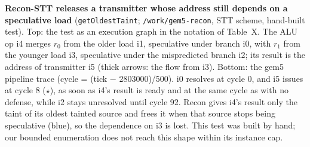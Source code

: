 \textbf{Recon-STT releases a transmitter whose address still depends on a speculative load} (\texttt{getOldestTaint}; \texttt{/work/gem5-recon}, STT scheme, hand-built test). Top: the test as an execution graph in the notation of Table~X. The ALU op i4 merges $r_0$ from the older load i1, speculative under branch i0, with $r_1$ from the younger load i3, speculative under the mispredicted branch i2; its result is the address of transmitter i5 (thick arrows: the flow from i3). Bottom: the gem5 pipeline trace (cycle = (tick $-$ 2803000)/500). i0 resolves at cycle 0, and i5 issues at cycle 8 ($\star$), as soon as i4's result is ready and at the same cycle as with no defense, while i2 stays unresolved until cycle 92. Recon gives i4's result only the taint of its oldest tainted source and frees it when that source stops being speculative (blue), so the dependence on i3 is lost. This test was built by hand; our bounded enumeration does not reach this shape within its instance cap.
